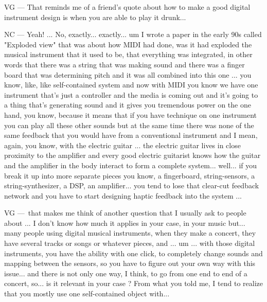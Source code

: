 VG — That reminds me of a friend's quote about how to make a good digital instrument design is when you are able to play it drunk... 

NC — Yeah! ... No, exactly... exactly... um I wrote a paper in the early 90s called "Exploded view" that was about how MIDI had done, was it had exploded the musical instrument that it used to be, that everything was integrated, in other words that there was a string that was making sound and there was a finger board that was determining pitch and it was all combined into this one ... you know, like, like self-contained system and now with MIDI you know we have one instrument that's just a controller and the media is coming out and it's going to a thing that's generating sound and it gives you tremendous power on the one hand, you know,  because it means that if you have technique on one instrument you can play all these other sounds but at the same time there was none of the same feedback that you would have from a conventional instrument and I mean, again, you know, with the electric guitar ... the electric guitar lives in close proximity to the amplifier and every good electric guitarist knows how the guitar and the amplifier in the body interact to form a complete system... well... if you break it up into more separate pieces you know, a fingerboard, string-sensors, a string-synthesizer, a DSP, an amplifier... you tend to lose that clear-cut feedback network and you have to start designing haptic feedback into the system ...

VG — that makes me think of another question that I usually ask to people about ... I don't know how much it applies in your case, in your music but... many people using digital musical instruments, when they make a concert, they have several tracks or songs or whatever pieces, and ... um ... with those digital instruments, you have the ability with one click, to completely change sounds and mapping between the sensors, so you have to figure out your own way with this issue... and there is not only one way, I think, to go from one end to end of a concert, so... is it relevant in your case ? From what you told me, I tend to realize that you mostly use one self-contained object with... 

